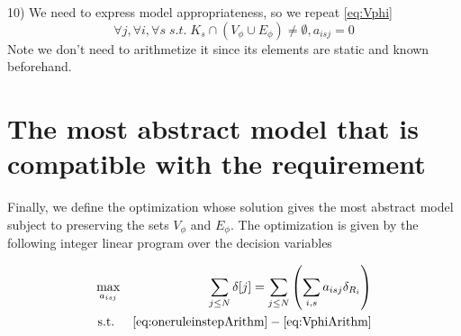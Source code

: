 \documentclass[11pt, oneside, reqno]{article}
\begin{document}
10) We need to express model appropriateness, so we repeat \eqref{eq:Vphi}
\begin{equation}
\label{eq:VphiArithm}
\forall j, \forall i, \forall s \; s.t. \; K_s \cap (V_\phi \cup E_\phi)\neq \emptyset, a_{isj}=0
\end{equation}
Note we don't need to arithmetize it since its elements are static and known beforehand.

\section{The most abstract model that is compatible with the requirement}

Finally, we define the optimization whose solution gives the most abstract model subject to preserving the sets $V_\phi$ and $E_\phi$.
The optimization is given by the following integer linear program over the decision variables

\begin{eqnarray}
\max_{a_{isj}} && \sum_{j \leq N} \delta[j] =\sum_{j \leq N} \left(\sum_{i,s}a_{isj}\delta_{R_i}\right)
\\
\textrm{s.t. }&& \eqref{eq:oneruleinstepArithm}-\eqref{eq:VphiArithm}
\end{eqnarray}
\end{document}

